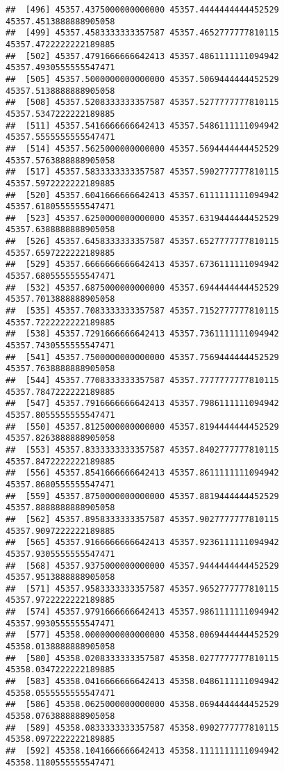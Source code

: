 \documentclass[
]{article}
\begin{document}
\begin{verbatim}
##  [496] 45357.4375000000000000 45357.4444444444452529 45357.4513888888905058
##  [499] 45357.4583333333357587 45357.4652777777810115 45357.4722222222189885
##  [502] 45357.4791666666642413 45357.4861111111094942 45357.4930555555547471
##  [505] 45357.5000000000000000 45357.5069444444452529 45357.5138888888905058
##  [508] 45357.5208333333357587 45357.5277777777810115 45357.5347222222189885
##  [511] 45357.5416666666642413 45357.5486111111094942 45357.5555555555547471
##  [514] 45357.5625000000000000 45357.5694444444452529 45357.5763888888905058
##  [517] 45357.5833333333357587 45357.5902777777810115 45357.5972222222189885
##  [520] 45357.6041666666642413 45357.6111111111094942 45357.6180555555547471
##  [523] 45357.6250000000000000 45357.6319444444452529 45357.6388888888905058
##  [526] 45357.6458333333357587 45357.6527777777810115 45357.6597222222189885
##  [529] 45357.6666666666642413 45357.6736111111094942 45357.6805555555547471
##  [532] 45357.6875000000000000 45357.6944444444452529 45357.7013888888905058
##  [535] 45357.7083333333357587 45357.7152777777810115 45357.7222222222189885
##  [538] 45357.7291666666642413 45357.7361111111094942 45357.7430555555547471
##  [541] 45357.7500000000000000 45357.7569444444452529 45357.7638888888905058
##  [544] 45357.7708333333357587 45357.7777777777810115 45357.7847222222189885
##  [547] 45357.7916666666642413 45357.7986111111094942 45357.8055555555547471
##  [550] 45357.8125000000000000 45357.8194444444452529 45357.8263888888905058
##  [553] 45357.8333333333357587 45357.8402777777810115 45357.8472222222189885
##  [556] 45357.8541666666642413 45357.8611111111094942 45357.8680555555547471
##  [559] 45357.8750000000000000 45357.8819444444452529 45357.8888888888905058
##  [562] 45357.8958333333357587 45357.9027777777810115 45357.9097222222189885
##  [565] 45357.9166666666642413 45357.9236111111094942 45357.9305555555547471
##  [568] 45357.9375000000000000 45357.9444444444452529 45357.9513888888905058
##  [571] 45357.9583333333357587 45357.9652777777810115 45357.9722222222189885
##  [574] 45357.9791666666642413 45357.9861111111094942 45357.9930555555547471
##  [577] 45358.0000000000000000 45358.0069444444452529 45358.0138888888905058
##  [580] 45358.0208333333357587 45358.0277777777810115 45358.0347222222189885
##  [583] 45358.0416666666642413 45358.0486111111094942 45358.0555555555547471
##  [586] 45358.0625000000000000 45358.0694444444452529 45358.0763888888905058
##  [589] 45358.0833333333357587 45358.0902777777810115 45358.0972222222189885
##  [592] 45358.1041666666642413 45358.1111111111094942 45358.1180555555547471

\end{verbatim}
\end{document}
